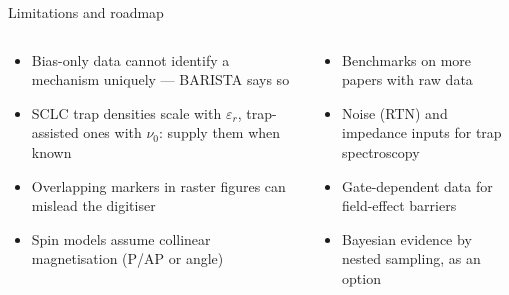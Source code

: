 \documentclass[aspectratio=169,10pt]{beamer}
\begin{document}
\begin{frame}{Limitations and roadmap}
\begin{columns}[T,onlytextwidth]
\begin{tcolorbox}[enhanced,colback=bad!4,colframe=bad!4,boxrule=0pt,arc=2mm,left=3mm,right=3mm,top=1.5mm,bottom=2mm,
   title={\semibold Limitations},coltitle=bad!85!black,colbacktitle=bad!4,fonttitle=\small,fontupper=\small,toptitle=1.2mm]
\begin{itemize}
  \item Bias-only data cannot identify a mechanism uniquely --- BARISTA says so
  \item SCLC trap densities scale with $\varepsilon_r$, trap-assisted ones with $\nu_0$: supply them when known
  \item Overlapping markers in raster figures can mislead the digitiser
  \item Spin models assume collinear magnetisation (P/AP or angle)
\end{itemize}
\end{tcolorbox}
\begin{tcolorbox}[enhanced,colback=good!5,colframe=good!5,boxrule=0pt,arc=2mm,left=3mm,right=3mm,top=1.5mm,bottom=2mm,
   title={\semibold Roadmap},coltitle=good!80!black,colbacktitle=good!5,fonttitle=\small,fontupper=\small,toptitle=1.2mm]
\begin{itemize}
  \item Benchmarks on more papers with raw data
  \item Noise (RTN) and impedance inputs for trap spectroscopy
  \item Gate-dependent data for field-effect barriers
  \item Bayesian evidence by nested sampling, as an option
\end{itemize}
\end{tcolorbox}
\end{columns}
\end{frame}
\end{document}
